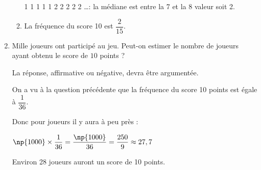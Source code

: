 \begin{enumerate}
\begin{enumerate}
1 1 1 1 1 2 2 2 2 2 \ldots : la médiane est entre la 7 et la 8 valeur soit 2.
		\item %
		La fréquence du score 10 est $\dfrac{2}{15}$.
		\end{enumerate}

\item Mille joueurs ont participé au jeu. Peut-on estimer le nombre de joueurs ayant obtenu le score de $10$ points ?

La réponse, affirmative ou négative, devra être argumentée.

On a vu à la question précédente que la fréquence du score 10 points est égale à $\dfrac{1}{36}$.

Donc pour  joueurs il y aura à peu près :

$\np{1000} \times \dfrac{1}{36} = \dfrac{\np{1000}}{36} = \dfrac{250}{9} \approx 27,7$

Environ 28 joueurs auront un score de 10 points.
\end{enumerate}


